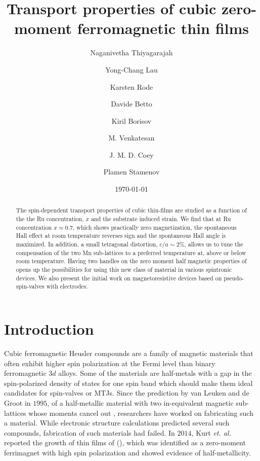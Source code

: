 \documentclass[reprint,aip,apl,floatfix,linenumbers,superscriptaddress]{revtex4-1}
\begin{document}
\title{Transport properties of cubic zero-moment ferromagnetic  thin films}
\author{Naganivetha Thiyagarajah}
\author{Yong-Chang Lau}
\author{Karsten Rode}
\author{Davide Betto}
\author{Kiril Borisov}
\author{M. Venkatesan}
\author{J. M. D. Coey}
\author{Plamen Stamenov}

\date{\today}

\begin{abstract}
The spin-dependent transport properties of cubic  thin-films are studied as a function of the the Ru concentration, $x$ and the substrate induced strain. We find that at Ru concentration $x\approx\num{0.7}$, which shows practically zero magnetization, the spontaneous Hall effect at room temperature reverses sign and the spontaneous Hall angle is maximized. In addition, a small tetragonal distortion, $c/a\sim\num{2}\%$, allows us to tune the compensation of the two Mn sub-lattices to a preferred temperature at, above or below room temperature. Having two handles on the zero moment half magnetic properties of  opens up the possibilities for using this new class of material in various spintronic devices. We also present the initial work on magnetoresistive devices based on pseudo-spin-valves with  electrodes.

\end{abstract}
\maketitle

\section{Introduction}
\label{sec:intro}

Cubic ferromagnetic Heusler compounds are a family of magnetic materials that often exhibit higher spin polarization at the Fermi level than binary ferromagnetic $3d$ alloys\cite{Graf2013}. Some of the materials are half-metals with a gap in the spin-polarized density of states for one spin band which should make them ideal candidates for spin-valves or MTJs\cite{PhysRevB.28.1745,Wang2009,Takahashi2011,Tsunegi2008}.  Since the prediction by van Leuken and de Groot in $1995$, of a half-metallic material with two in-equivalent magnetic sub-lattices whose moments cancel out \cite{PhysRevLett.50.2024}, researchers have worked on fabricating such a material. While electronic structure calculations predicted several such compounds\cite{Wurmehl2006, Hu2012, Galanakis2006}, fabrication of such materials had failed\cite{Hu2012,PhysRevB.79.100406}. In $2014$, Kurt \textit{et. al.} reported the growth of thin films of  (), which was identified as a zero-moment ferrimagnet with high spin polarization and showed evidence of half-metallicity\cite{KurtPRL2014}. 
\end{document}
